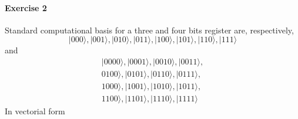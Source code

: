 \documentclass[a4paper,10pt]{article}
\begin{document}
\paragraph{Exercise 2}
\label{ex02a}
Standard computational basis for a three and four bits register are, respectively, 
$$|000\rangle, |001\rangle, |010\rangle, |011\rangle, |100\rangle, |101\rangle, |110\rangle, |111\rangle$$
and 
\begin{equation*}
\begin{split} 
|0000\rangle, |0001\rangle, |0010\rangle, |0011\rangle, \\ 0100\rangle, |0101\rangle, |0110\rangle, |0111\rangle, \\
1000\rangle, |1001\rangle, |1010\rangle, |1011\rangle, \\
1100\rangle, |1101\rangle, |1110\rangle, |1111\rangle
\end{split}
\end{equation*}
In vectorial form
\end{document}
